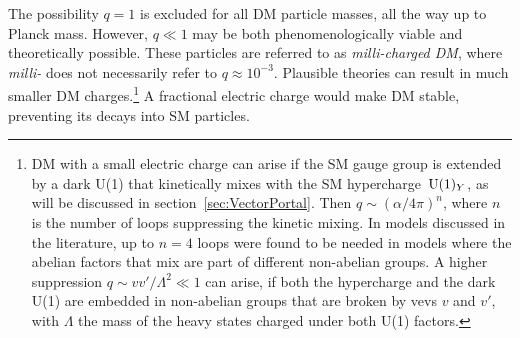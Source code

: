 The possibility $q=1$ is excluded for all DM particle masses, all the way up to Planck mass. However, $q\ll1$ may be both phenomenologically viable and theoretically possible. 
These particles are referred to as {\em milli-charged DM}, where {\em milli-} does not necessarily refer to $q \approx 10^{-3}$.
Plausible theories can result in much smaller DM charges.\footnote{DM with a small electric charge can arise if the SM gauge group is extended by a dark U(1) that kinetically mixes with the SM hypercharge $\,{\rm U}(1)_Y$,
as will be discussed in section~\ref{sec:VectorPortal}.  
Then $q\sim (\alpha/4\pi)^n$, where $n$ is the number of loops suppressing the kinetic mixing. In models discussed in the literature, 
up to $n=4$ loops were found to be needed in models where the abelian factors that mix are part of different non-abelian groups.
A higher suppression $q\sim v v'/\Lambda^2\ll 1$
can arise, if both the hypercharge and the dark U(1) are embedded in non-abelian groups that are broken by vevs $v$ and $v'$, with $\Lambda$ the mass of the heavy states charged under both U(1) factors. }
A fractional electric charge would make DM stable, preventing its decays into SM particles.

\medskip

